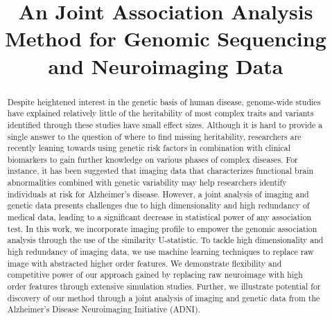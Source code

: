 \documentclass[11pt]{article}
\begin{document}
\title{An Joint Association Analysis Method for Genomic Sequencing and Neuroimaging Data}
\maketitle
{}

\clearpage
\begin{abstract}
Despite heightened interest in the genetic basis of human disease, genome-wide studies have explained relatively little of the heritability of most complex traits and variants identified through these studies have small effect sizes. Although it is hard to provide a single answer to the question of where to find missing heritability, researchers are recently leaning towards using genetic risk factors in combination with clinical biomarkers to gain further knowledge on various phases of complex diseases. For instance, it has been suggested that imaging data that characterizes functional brain abnormalities combined with genetic variability may help researchers identify individuals at risk for Alzheimer's disease. However, a joint analysis of imaging and genetic data presents challenges due to high dimensionality and high redundancy of medical data, leading to a significant decrease in statistical power of any association test. In this work, we incorporate imaging profile to empower the genomic association analysis through the use of the similarity U-statistic. To tackle high dimensionality and high redundancy of imaging data, we use machine learning techniques to replace raw image with abstracted higher order features. We demonstrate flexibility and competitive power of our approach gained by replacing raw neuroimage with high order features through extensive simulation studies. Further, we illustrate potential for discovery of our method through a joint analysis of imaging and genetic data from the Alzheimer’s Disease Neuroimaging Initiative (ADNI).
\end{abstract}
\clearpage
\end{document}
